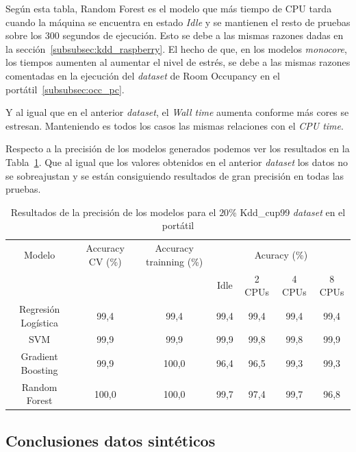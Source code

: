 \documentclass[a4paper, 12pt]{book}
\begin{document}
Según esta tabla, Random Forest es el modelo que más tiempo de CPU tarda cuando la máquina se encuentra en estado \textit{Idle} y se mantienen el resto de pruebas sobre los $300$ segundos de ejecución. Esto se debe a las mismas razones dadas en la sección~\ref{subsubsec:kdd_raspberry}. El hecho de que, en los modelos \textit{monocore}, los tiempos aumenten al aumentar el nivel de estrés, se debe a las mismas razones comentadas en la ejecución del \textit{dataset} de Room Occupancy en el portátil~\ref{subsubsec:occ_pc}.

Y al igual que en el anterior \textit{dataset}, el \textit{Wall time} aumenta conforme más cores se estresan. Manteniendo es todos los casos las mismas relaciones con el \textit{CPU time}.

Respecto a la precisión de los modelos generados podemos ver los resultados en la Tabla~\ref{tab:acc_Kddpc}. Que al igual que los valores obtenidos en el anterior \textit{dataset} los datos no se sobreajustan y se están consiguiendo resultados de gran precisión en todas las pruebas.\\
\begin{table}[htb]
\renewcommand{\arraystretch}{1.5}
\begin{adjustbox}{width=\textwidth}
\centering
    \begin{tabular}{c  c  c  c  c  c  c}
    \hline
    Modelo & Accuracy CV (\%) & Accuracy trainning (\%) & \multicolumn{4}{c}{Acuracy (\%)} \\
    \cline{4-7}
     &  &   &  Idle & 2 CPUs & 4 CPUs & 8 CPUs \\
     \hline
     Regresión Logística & 99,4 & 99,4 & 99,4 & 99,4 & 99,4 & 99,4\\
     SVM & 99,9 & 99,9 & 99,9 & 99,8 & 99,8 & 99,9\\
     Gradient Boosting & 99,9 & 100,0 & 96,4 & 96,5 & 99,3 & 99,3 \\
     Random Forest & 100,0 & 100,0 & 99,7 & 97,4 & 99,7 & 96,8\\
    \hline
    \end{tabular}
\end{adjustbox}
\caption{Resultados de la precisión de los modelos para el $20$\% Kdd\_cup99 \textit{dataset} en el portátil}
\label{tab:acc_Kddpc}
\end{table}

\subsection{Conclusiones datos sintéticos}
\label{subsec:conclusion_sinteticos}
\end{document}
